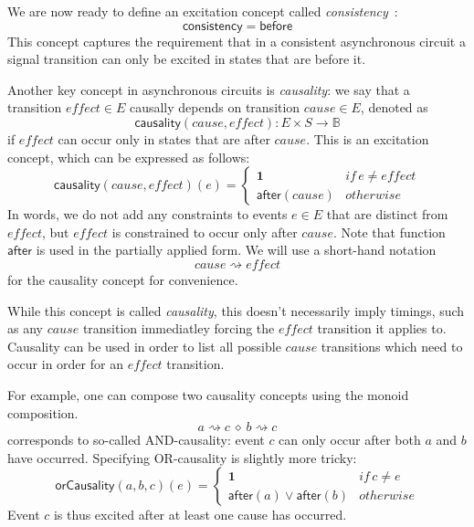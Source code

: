 \documentclass[british,compsoc]{IEEEtran}
\begin{document}
We are now ready to define an excitation concept called \emph{consistency}~\cite{Cortadella}:
\[
\mathsf{consistency}=\mathsf{before}
\]
This concept captures the requirement that in a consistent asynchronous
circuit a signal transition can only be excited in states that are
before it.

Another key concept in asynchronous circuits is \emph{causality}:
we say that a transition $\mathit{effect}\in E$ causally depends
on transition $\mathit{cause}\in E$, denoted as
\[
\mathsf{causality}(\mathit{cause},\mathit{effect}):E\times S\rightarrow\mathbb{B}
\]
 if $\mathit{effect}$ can occur only in states that are after $\mathit{cause}$.
This is an excitation concept, which can be expressed as follows:
\[
\mathsf{causality}(\mathit{cause},\mathit{effect})(e)\!=\!\begin{cases}
\mathbf{1} & \mathit{if}\, e\neq\mathit{effect}\\
\mathsf{after}(cause) & \mathit{otherwise}
\end{cases}
\]
In words, we do not add any constraints to events $e\in E$ that are
distinct from $\mathit{effect}$, but $\mathit{effect}$ is constrained
to occur only after $\mathit{cause}$. Note that function $\mathsf{after}$
is used in the partially applied form. We will use a short-hand notation
\[
\mathit{cause}\rightsquigarrow\mathit{effect}
\]
for the causality concept for convenience.

While this concept is called \emph{causality}, this doesn't necessarily imply timings, such as any $\mathit{cause}$ transition immediatley forcing the
$\mathit{effect}$ transition it applies to. Causality can be used in order to list all possible $\mathit{cause}$ transitions which need to occur in order
for an $\mathit{effect}$ transition.

For example, one can compose two causality concepts using the monoid composition.
\[
a\rightsquigarrow c\ \diamond\ b\rightsquigarrow c
\]
corresponds to so-called AND-causality: event $c$ can only occur
after both $a$ and $b$ have occurred. Specifying OR-causality is
slightly more tricky:
\[
\mathsf{orCausality}(a,b,c)(e)=\begin{cases}
\mathbf{1} & \mathit{if}\, c\neq\mathit{e}\\
\mathsf{after}(a)\vee\mathsf{after}(b) & \mathit{otherwise}
\end{cases}
\]
Event $c$ is thus excited after at least one cause has occurred.
\end{document}
